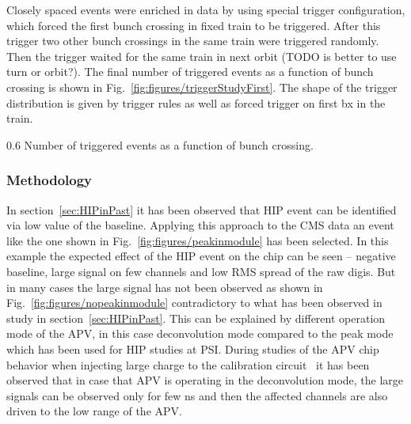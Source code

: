 Closely spaced events were enriched in data by using special trigger configuration, which forced the first bunch crossing in fixed train to be triggered. After this trigger two other bunch crossings in the same train were triggered randomly. Then the trigger waited for the same train in next orbit (TODO is better to use turn or orbit?). The final number of triggered events as a function of bunch crossing is shown in Fig.~\ref{fig:figures/triggerStudyFirst}. The shape of the trigger distribution is given by trigger rules as well as forced trigger on first bx in the train.


                 {0.6}       %
                 {Number of triggered events as a function of bunch crossing.} %


 \subsubsection{Methodology}
 

In section~\ref{sec:HIPinPast} it has been observed that HIP event can be identified via low value of the baseline. Applying this approach to the CMS data an event like the one shown in Fig.~\ref{fig:figures/peakinmodule} has been selected. In this example the expected effect of the HIP event on the chip can be seen -- negative baseline, large signal on few channels and low RMS spread of the raw digis. But in many cases the large signal has not been observed as shown in Fig.~\ref{fig:figures/nopeakinmodule} contradictory to what has been observed in study in section~\ref{sec:HIPinPast}. This can be explained by different operation mode of the APV, in this case deconvolution mode compared to the peak mode which has been used for HIP studies at PSI. During studies of the APV chip behavior when injecting large charge to the calibration circuit~\cite{Bainbridge:2002bda} it has been observed that in case that APV is operating in the deconvolution mode, the large signals can be observed only for few ns and then the affected channels are also driven to the low range of the APV. 

